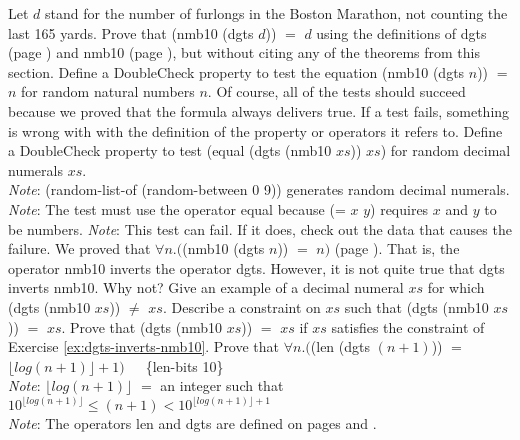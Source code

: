 \begin{ExerciseList}
\Exercise Let $d$ stand for the number of furlongs in
     the Boston Marathon, not counting the last 165 yards.
     Prove that \textsf{(nmb10 (dgts $d$))} $=$ $d$
     using the definitions of \textsf{dgts} (page \pageref{dgts-defun})
     and \textsf{nmb10} (page \pageref{nmb10-defun}),
     but without citing any of the theorems from this section.
\Exercise Define a DoubleCheck property to test
     the equation \textsf{(nmb10 (dgts $n$))} $=$ $n$ for random
     natural numbers $n$.
     Of course, all of the tests should succeed because
     we proved that the formula always delivers true.
     If a test fails, something is wrong with
     with the definition of the property or operators it refers to.
\Exercise Define a DoubleCheck property to test
     \textsf{(equal (dgts (nmb10 $xs$)) $xs$)} for random
     decimal numerals $xs$.\\
     \emph{Note}: \textsf{(random-list-of (random-between 0 9))}
     generates random decimal numerals.\\
     \emph{Note}: The test must use the operator
     \textsf{equal} because \textsf{(= $x$ $y$)}
     requires $x$ and $y$ to be numbers.
     \emph{Note}: This test can fail.
     If it does, check out the data that causes the failure.
\Exercise We proved that
     $\forall n. ($\textsf{(nmb10 (dgts $n$))} $=$ $n)$ (page \pageref{dgts-ok}).
     That is, the operator \textsf{nmb10}
     inverts the operator \textsf{dgts}.
     However, it is not quite true that \textsf{dgts} inverts \textsf{nmb10}.
     Why not? Give an example of a decimal numeral
     $xs$ for which \textsf{(dgts (nmb10 $xs$))} $\neq$ $xs$.
\Exercise \label{ex:dgts-inverts-nmb10}
     Describe a constraint on $xs$ such that
     \textsf{(dgts (nmb10 $xs$))} $=$ $xs$.
\Exercise Prove that
    \textsf{(dgts (nmb10 $xs$))} $=$ $xs$
     if $xs$ satisfies the constraint of Exercise \ref{ex:dgts-inverts-nmb10}.
\Exercise Prove that
    $\forall n.($\textsf{(len (dgts $(n+1)$))} $=$ $\lfloor log(n+1) \rfloor + 1)$~~~\{len-bits 10\}\\
    \hspace*{16mm}\emph{Note}: $\lfloor log(n+1) \rfloor$ $=$ an integer such that
    $10^{\lfloor log(n+1) \rfloor} \le (n+1) < 10^{\lfloor log(n+1) \rfloor + 1}$\\
    \hspace*{16mm}\emph{Note}: The operators \textsf{len} and \textsf{dgts}
    are defined on pages \pageref{len-equations} and \pageref{dgts-defun}.

\end{ExerciseList}

